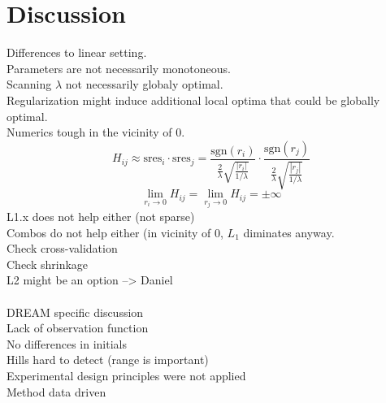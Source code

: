 \documentclass{bioinfo}
\begin{document}
%
%






\section{Discussion}

Differences to linear setting.\\
Parameters are not necessarily monotoneous.\\
Scanning $\lambda$ not necessarily globaly optimal.\\
Regularization might induce additional local optima that could be globally optimal.\\
Numerics tough in the vicinity of 0.\\
\begin{equation}
	H_{ij} \approx \text{sres}_i \cdot \text{sres}_j = \frac{\text{sgn}(r_i)}{\frac{2}{\lambda}\sqrt{\frac{|r_i|}{1/\lambda}}} \cdot \frac{\text{sgn}(r_j)}{\frac{2}{\lambda}\sqrt{\frac{|r_j|}{1/\lambda}}}
\end{equation}
\begin{equation}
	\lim_{r_i \rightarrow 0} H_{ij} = \lim_{r_j \rightarrow 0} H_{ij} = \pm \infty
\end{equation}
L1.x does not help either (not sparse)\\
Combos do not help either (in vicinity of 0, $L_1$ diminates anyway.\\
Check cross-validation\\
Check shrinkage\\
L2 might be an option --> Daniel\\ \\
DREAM specific discussion\\
Lack of observation function\\
No differences in initials\\
Hills hard to detect (range is important)\\
Experimental design principles were not applied\\
Method data driven
\end{document}
